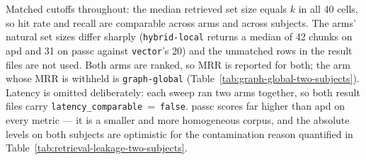 \begin{table}[htbp]
  \vspace{0.5em}
  \footnotesize
  Matched cutoffs throughout: the median retrieved set size equals $k$ in all 40 cells, so hit rate
  and recall are comparable across arms and across subjects. The arms' natural set sizes differ
  sharply (\texttt{hybrid-local} returns a median of 42 chunks on apd and 31 on passc against
  \texttt{vector}'s 20) and the unmatched rows in the result files are not used. Both arms are
  ranked, so MRR is reported for both; the arm whose MRR is withheld is \texttt{graph-global}
  (Table~\ref{tab:graph-global-two-subjects}). Latency is omitted deliberately: each sweep ran two
  arms together, so both result files carry \texttt{latency\_comparable}~=~\texttt{false}. passc
  scores far higher than apd on every metric --- it is a smaller and more homogeneous corpus, and
  the absolute levels on both subjects are optimistic for the contamination reason quantified in
  Table~\ref{tab:retrieval-leakage-two-subjects}.
\end{table}
